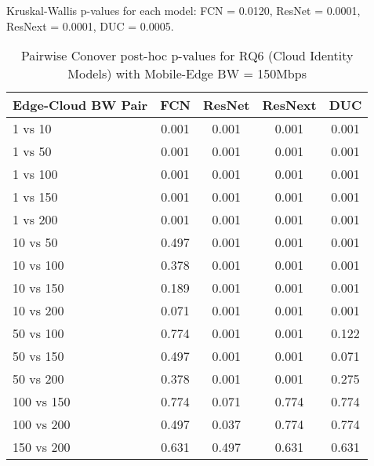 \begin{table}[h]
\centering
\caption{Pairwise Conover post-hoc p-values for RQ6 (Cloud Identity Models) with Mobile-Edge BW = 150Mbps}
\label{tab:conover_cloud_identity_me150}
\smallskip
Kruskal-Wallis p-values for each model: FCN = 0.0120, ResNet = 0.0001, ResNext = 0.0001, DUC = 0.0005.

\begin{tabular}{lcccc}
\toprule
Edge-Cloud BW Pair & FCN & ResNet & ResNext & DUC \\
\midrule
1 vs 10 & 0.001 & 0.001 & 0.001 & 0.001 \\
1 vs 50 & 0.001 & 0.001 & 0.001 & 0.001 \\
1 vs 100 & 0.001 & 0.001 & 0.001 & 0.001 \\
1 vs 150 & 0.001 & 0.001 & 0.001 & 0.001 \\
1 vs 200 & 0.001 & 0.001 & 0.001 & 0.001 \\
10 vs 50 & 0.497 & 0.001 & 0.001 & 0.001 \\
10 vs 100 & 0.378 & 0.001 & 0.001 & 0.001 \\
10 vs 150 & 0.189 & 0.001 & 0.001 & 0.001 \\
10 vs 200 & 0.071 & 0.001 & 0.001 & 0.001 \\
50 vs 100 & 0.774 & 0.001 & 0.001 & 0.122 \\
50 vs 150 & 0.497 & 0.001 & 0.001 & 0.071 \\
50 vs 200 & 0.378 & 0.001 & 0.001 & 0.275 \\
100 vs 150 & 0.774 & 0.071 & 0.774 & 0.774 \\
100 vs 200 & 0.497 & 0.037 & 0.774 & 0.774 \\
150 vs 200 & 0.631 & 0.497 & 0.631 & 0.631 \\
\bottomrule
\end{tabular}
\end{table}

